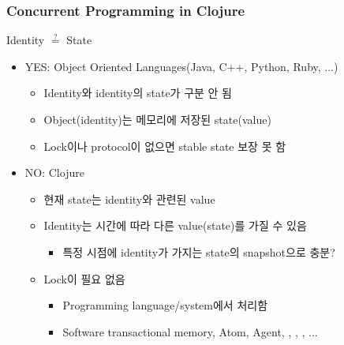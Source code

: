 \begin{frame}[fragile]
\frametitle{Concurrent Programming in Clojure}

\begin{center}
Identity $\stackrel{?}{=}$ State
\end{center}

\begin{itemize}
\item YES: Object Oriented Languages(Java, C++, Python, Ruby, ...)
  \begin{itemize}
  \item Identity와 identity의 state가 구분 안 됨
  \item Object(identity)는 메모리에 저장된 state(value)
  \item Lock이나 protocol이 없으면 stable state 보장 못 함
  \end{itemize}
\item NO: Clojure
  \begin{itemize}
  \item 현재 state는 identity와 관련된 value
  \item Identity는 시간에 따라 다른 value(state)를 가질 수 있음
    \begin{itemize}
    \item 특정 시점에 identity가 가지는 state의 snapshot으로 충분?
    \end{itemize}
  \item Lock이 필요 없음
    \begin{itemize}
    \item Programming language/system에서 처리함
    \item Software transactional memory, Atom, Agent, , , , ...
    \end{itemize}
  \end{itemize}
\end{itemize}


\end{frame}


